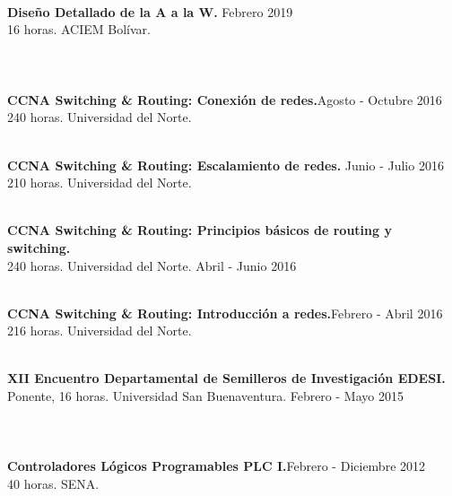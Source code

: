\documentclass[margin]{res}
\begin{document}
\begin{resume}
\section{\centering}
\hfill
\\\textbf{Diseño Detallado de la A a la W.} \hfill Febrero 2019
\\16 horas. ACIEM Bolívar.

\section{\centering}
\hfill
\\\textbf{CCNA Switching \& Routing: Conexión de redes.}\hfill Agosto - Octubre 2016
\\240 horas. Universidad del Norte. 

\\\textbf{CCNA Switching \& Routing: Escalamiento de redes.} \hfill Junio - Julio 2016
\\210 horas. Universidad del Norte. 

\\\textbf{CCNA Switching \& Routing: Principios básicos de routing y switching.}
\\240 horas. Universidad del Norte. \hfill Abril - Junio 2016

\\\textbf{CCNA Switching \& Routing: Introducción a redes.}\hfill Febrero - Abril 2016
\\216 horas. Universidad del Norte. 

\\\textbf{XII Encuentro Departamental de Semilleros de Investigación EDESI.}
\\Ponente, 16 horas. Universidad San Buenaventura. \hfill Febrero - Mayo 2015


\section{\centering}
\hfill
\\\textbf{Controladores Lógicos Programables PLC I.}\hfill Febrero - Diciembre 2012
\\40 horas. SENA. 


\end{resume}
\end{document}
